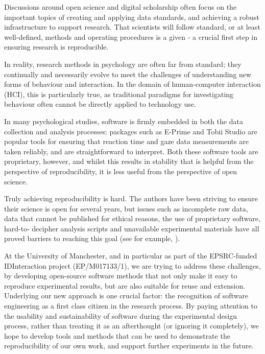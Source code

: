 \documentclass[a4paper,USenglish]{dagrep}
\begin{document}
{}
\license
{}
Discussions around open science and digital scholarship often focus on the 
important topics of creating and applying data standards, and achieving a robust  
infrastructure to support research. That scientists will follow standard, or at 
least well-defined, methods and operating procedures is a given - a crucial first 
step in ensuring research is reproducible.

In reality, research methods in psychology are often far from standard; they 
continually and necessarily evolve to meet the challenges of understanding 
new forms of behaviour and interaction. In the domain of human-computer 
interaction (HCI), this is particularly true, as traditional paradigms for
investigating behaviour often cannot be directly applied to technology use.

In many psychological studies, software is firmly embedded in both the data 
collection and analysis processes: packages such as E-Prime and Tobii Studio are
popular tools for ensuring that reaction time and gaze data measurements are
taken reliably, and are straightforward to interpret. Both these software tools
are proprietary, however, and whilst this results in stability that is helpful from
the perspective of reproducibility, it is less useful from the perspective of open
science.

Truly achieving reproducibility is hard. The authors have been striving to ensure 
their science is open for several years, but issues such as incomplete raw data, data 
that cannot be published for ethical reasons, the use of proprietary software, hard-to-
decipher analysis scripts and unavailable experimental materials have all proved 
barriers to reaching this goal (see for example, \cite{Jay2013TR}).

At the University of Manchester, and in particular as part of the EPSRC-funded 
IDInteraction project (EP/M017133/1), we are trying to address these challenges, by 
developing open-source software methods that not only make it easy to 
reproduce experimental results, but are also suitable for reuse and extension. 
Underlying our new approach is one crucial factor: the recognition of software 
engineering as a first class citizen in the research process. By paying attention to the 
usability and sustainability of software during the 
experimental design process, rather than treating it as an afterthought (or ignoring 
it completely), we hope to develop tools and methods that can be used to demonstrate 
the reproducibility of our own work, and support further experiments in the future.
\end{document}

